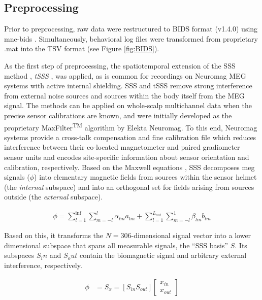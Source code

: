\subsection{Preprocessing}

Prior to preprocessing, raw data were restructured to \gls{BIDS} format (v1.4.0) using mne-bids \citep{Appelhoff2019}.
Simultaneously, behavioral log files were transformed from proprietary .mat into the TSV format (see Figure \ref{fig:BIDS}).

As the first step of preprocessing, the spatiotemporal extension of the \gls{SSS} method \citep{taulu2005presentation}, \textit{\gls{tSSS}} \citep{taulu2006spatiotemporal}, was applied, as is common for recordings on Neuromag MEG systems with active internal shielding.
\gls{SSS} and \gls{tSSS} remove strong interference from external noise sources and sources within the body itself from the MEG signal.
The methods can be applied on whole-scalp multichannel data when the precise sensor calibrations are known, and were initially developed as the proprietary MaxFilter\textsuperscript{TM} algorithm by Elekta Neuromag.
To this end, Neuromag systems provide a cross-talk compensation and fine calibration file which reduces interference between their co-located magnetometer and paired gradiometer sensor units and encodes site-specific information about sensor orientation and calibration, respectively.
Based on the Maxwell equations \citep{taulu2006spatiotemporal}, \gls{SSS} decomposes \gls{meg} signals ($\phi$) into elementary magnetic fields from sources within the sensor helmet (the \textit{internal} subspace) and into an orthogonal set for fields arising from sources outside (the \textit{external} subspace).

\begin{equation}
	\begin{aligned}
	  \phi = \sum_{l=1}^{\inf}\sum_{m=-l}^{l} \alpha_{lm} a_{lm} + \sum_{l=1}^{L_{out}}\sum_{m=-l}^{1}\beta_{lm}b_{lm}
	\end{aligned}
\label{eq:sss}
\end{equation}

Based on this, it transforms the $N=306$-dimensional signal vector into a lower dimensional subspace that spans all measurable signals, the ``SSS basis'' $S$. Its subspaces $S_in$ and $S_out$ contain the biomagnetic signal and arbitrary external interference, respectively.

\begin{equation}
	\begin{aligned}
		    \phi &= S_x = [S_{in} S_{out}] \begin{bmatrix}
			x_{in} \\
			x_{out}
		\end{bmatrix}
	\end{aligned}
	\label{eq:sss}
\end{equation}

